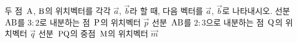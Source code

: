 두 점~$\mathrm{A}$, $\mathrm{B}$의 위치벡터를 각각 $\vec{a}$, $\vec{b}$라 할 때, 다음 벡터를 $\vec{a}$, $\vec{b}$로 나타내시오.
 선분~$\mathrm{AB}$를 $3:2$로 내분하는 점~$\mathrm{P}$의 위치벡터 $\vec{p}$
 선분~$\mathrm{AB}$를 $2:3$으로 내분하는 점~$\mathrm{Q}$의 위치벡터 $\vec{q}$
 선분~$\mathrm{PQ}$의 중점~$\mathrm{M}$의 위치벡터 $\vec{m}$
